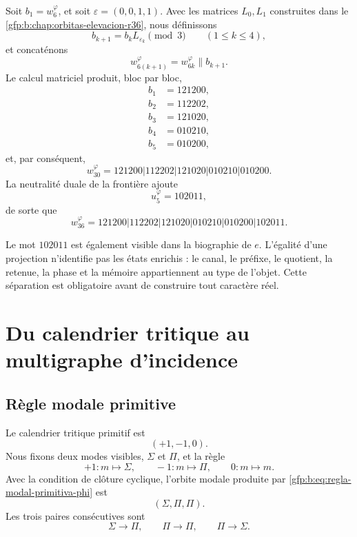 Soit \(b_1=w_6^{\varphi}\), et soit
\(\varepsilon=(0,0,1,1)\). Avec les matrices \(L_0,L_1\) construites dans le
\cref{gfp:b:chap:orbitas-elevacion-r36}, nous définissons
\[
 b_{k+1}=b_kL_{\varepsilon_k}\pmod3
 \qquad(1\leq k\leq4),
\]
et concaténons
\[
 w_{6(k+1)}^{\varphi}=w_{6k}^{\varphi}\mathbin{\|}b_{k+1}.
\]
Le calcul matriciel produit, bloc par bloc,
\[
\begin{aligned}
 b_1&=121200,\\
 b_2&=112202,\\
 b_3&=121020,\\
 b_4&=010210,\\
 b_5&=010200,
\end{aligned}
\]
et, par conséquent,
\begin{equation}
 \boxed{
 w_{30}^{\varphi}
 =121200|112202|121020|010210|010200.}
 \label{gfp:b:eq:w30-phi}
\end{equation}
La neutralité duale de la frontière ajoute
\[
 u_5^{\varphi}=102011,
\]
de sorte que
\begin{equation}
 \boxed{
 w_{36}^{\varphi}
 =121200|112202|121020|010210|010200|102011.}
 \label{gfp:b:eq:w36-phi}
\end{equation}

\begin{remark}
Le mot \(102011\) est également visible dans la biographie de \(e\). L’égalité
d’une projection n’identifie pas les états enrichis : le canal,
le préfixe, le quotient, la retenue, la phase et la mémoire appartiennent au type
de l’objet. Cette séparation est obligatoire avant de construire tout
caractère réel.
\end{remark}

\section{Du calendrier tritique au multigraphe d’incidence}

\subsection{Règle modale primitive}

Le calendrier tritique primitif est
\[
 (+1,-1,0).
\]
Nous fixons deux modes visibles, \(\Sigma\) et \(\Pi\), et la règle
\begin{equation}
 +1:m\longmapsto\Sigma,
 \qquad
 -1:m\longmapsto\Pi,
 \qquad
 0:m\longmapsto m.
 \label{gfp:b:eq:regla-modal-primitiva-phi}
\end{equation}
Avec la condition de clôture cyclique, l’orbite modale produite par
\eqref{gfp:b:eq:regla-modal-primitiva-phi} est
\[
 \boxed{(\Sigma,\Pi,\Pi).}
\]
Les trois paires consécutives sont
\[
 \Sigma\longrightarrow\Pi,
 \qquad
 \Pi\longrightarrow\Pi,
 \qquad
 \Pi\longrightarrow\Sigma.
\]

